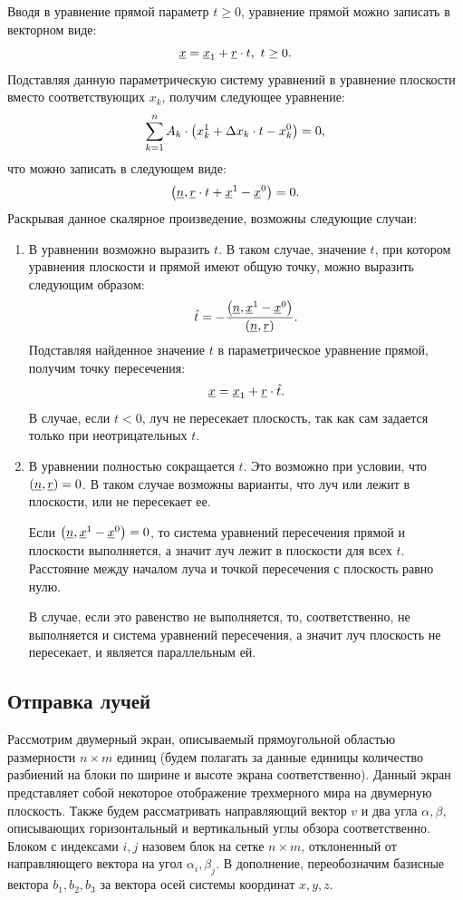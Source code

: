 	Вводя в уравнение прямой параметр $t \ge 0$, уравнение прямой можно записать в векторном виде:
	\[ \underline{x} = \underline{x}_1 + \underline{r} \cdot t, ~ t \ge 0. \]
	Подставляя данную параметрическую систему уравнений в уравнение плоскости вместо соответствующих $x_k$, получим следующее уравнение:
	\[ \sum_{k = 1}^{n} A_k \cdot \left( x_k^1 + \Delta x_k \cdot t - x_k^0 \right) = 0, \]
	что можно записать в следующем виде:
	\[ \left( \underline{n}, \underline{r} \cdot t + \underline{x}^1 - \underline{x}^0 \right) = 0. \]
	Раскрывая данное скалярное произведение, возможны следующие случаи:
	\begin{enumerate}
		\item В уравнении возможно выразить $t$. В таком случае, значение $t$, при котором уравнения плоскости и прямой имеют общую точку, можно выразить следующим образом:
			\[ \hat{t} = -\frac{ \left( \underline{n}, \underline{x}^1 - \underline{x}^0 \right) }{ \left( \underline{n}, \underline{r} \right) }. \]
			Подставляя найденное значение $t$ в параметрическое уравнение прямой, получим точку пересечения:
			\[ \underline{x} = \underline{x}_1 + \underline{r} \cdot \hat{t}. \]
			В случае, если $t < 0$, луч не пересекает плоскость, так как сам задается только при неотрицательных $t$.

		\item В уравнении полностью сокращается $t$. Это возможно при условии, что \( \left( \underline{n}, \underline{r} \right) = 0 \). В таком случае возможны варианты, что луч или лежит в плоскости, или не пересекает ее. 

			Если \( \left( \underline{n}, \underline{x}^1 - \underline{x}^0 \right) = 0 \), то система уравнений пересечения прямой и плоскости выполняется, а значит луч лежит в плоскости для всех $t$. Расстояние между началом луча и точкой пересечения с плоскость равно нулю.
			
			В случае, если это равенство не выполняется, то, соответственно, не выполняется и система уравнений пересечения, а значит луч плоскость не пересекает, и является параллельным ей.
	\end{enumerate}


\subsection{Отправка лучей}
	
	Рассмотрим двумерный экран, описываемый прямоугольной областью размерности \( n \times m \) единиц (будем полагать за данные единицы количество разбиений на блоки по ширине и высоте экрана соответственно). Данный экран представляет собой некоторое отображение трехмерного мира на двумерную плоскость. Также будем рассматривать направляющий вектор $v$ и два угла \( \alpha, \beta \), описывающих горизонтальный и вертикальный углы обзора соответственно. Блоком с индексами \( i, j \) назовем блок на сетке \( n \times m \), отклоненный от направляющего вектора на угол \( \alpha_i, \beta_j \). В дополнение, переобозначим базисные вектора \( b_1, b_2, b_3 \) за вектора осей системы координат \( x, y, z \).

